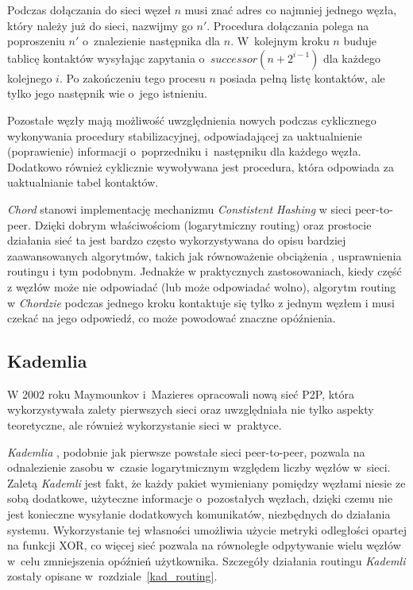 \documentclass[a4paper,11pt]{scrartcl}
\begin{document}
Podczas dołączania do sieci węzeł $n$ musi znać adres co najmniej jednego węzła, który należy już do sieci, nazwijmy go $n'$. Procedura dołączania polega na poproszeniu $n'$ o~znalezienie następnika dla $n$. W~kolejnym kroku $n$ buduje tablicę kontaktów wysyłając zapytania o~$successor(n + 2^{i-1})$ dla każdego kolejnego $i$. Po zakończeniu tego procesu $n$ posiada pełną listę kontaktów, ale tylko jego następnik wie o~jego istnieniu.

Pozostałe węzły mają możliwość uwzględnienia nowych podczas cyklicznego wykonywania procedury stabilizacyjnej, odpowiadającej za uaktualnienie (poprawienie) informacji o~poprzedniku i~następniku dla każdego węzła. Dodatkowo również cyklicznie wywoływana jest procedura, która odpowiada za uaktualnianie tabel kontaktów.

\textit{Chord} stanowi implementację mechanizmu \textit{Constistent Hashing} w sieci peer-to-peer. Dzięki dobrym właściwościom (logarytmiczny routing) oraz prostocie działania sieć ta jest bardzo często wykorzystywana do opisu bardziej zaawansowanych algorytmów, takich jak równoważenie obciążenia \cite{rao2003load}, usprawnienia routingu \cite{manku2004know} i tym podobnym. Jednakże w praktycznych zastosowaniach, kiedy część z węzłów może nie odpowiadać (lub może odpowiadać wolno), algorytm routing w \textit{Chordzie} podczas jednego kroku kontaktuje się tylko z jednym węzłem i musi czekać na jego odpowiedź, co może powodować znaczne opóźnienia. 


\subsection{Kademlia}
W 2002 roku Maymounkov i~Mazieres opracowali nową sieć P2P, która wykorzystywała zalety pierwszych sieci oraz uwzględniała nie tylko aspekty teoretyczne, ale również wykorzystanie sieci w~praktyce.

\textit{Kademlia} \cite{maymounkov2002kademlia}, podobnie jak pierwsze powstałe sieci peer-to-peer, pozwala na odnalezienie zasobu w~czasie logarytmicznym względem liczby węzłów w~sieci. Zaletą \textit{Kademli} jest fakt, że każdy pakiet wymieniany pomiędzy węzłami niesie ze sobą dodatkowe, użyteczne informacje o~pozostałych węzłach, dzięki czemu nie jest konieczne wysyłanie dodatkowych komunikatów, niezbędnych do działania systemu. Wykorzystanie tej własności umożliwia użycie metryki odległości opartej na funkcji XOR, co więcej sieć pozwala na równoległe odpytywanie wielu węzłów w~celu zmniejszenia opóźnień użytkownika. Szczegóły działania routingu \textit{Kademli} zostały opisane w~rozdziale~\ref{kad_routing}.
\end{document}
